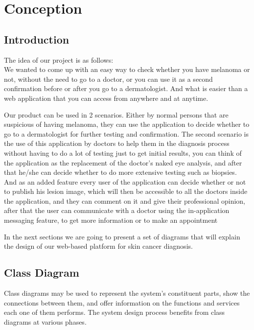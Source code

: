 \section{Conception}
\subsection{Introduction}
The idea of our project is as follows: \\ 
We wanted to come up with an easy way to check whether you have melanoma or not, without the need to go to a doctor, or you can use it as a second confirmation before or after you go to a dermatologist. And what is easier than a web application that you can access from anywhere and at anytime.

Our product can be used in 2 scenarios. Either by normal persons that are suspicious of having melanoma, they can use the application to decide whether to go to a dermatologist for further testing and confirmation. The second scenario is the use of this application by doctors to help them in the diagnosis process without having to do a lot of testing just to get initial results, you can think of the application as the replacement of the doctor's naked eye analysis, and after that he/she can decide whether to do more extensive testing such as biopsies. And as an added feature every user of the application can decide whether or not to publish his lesion image, which will then be accessible to all the doctors inside the application, and they can comment on it and give their professional opinion, after that the user can communicate with a doctor using the in-application messaging feature, to get more information or to make an appointment

In the next sections we are going to present a set of diagrams that will explain the design of our web-based platform for skin cancer diagnosis.

\subsection{Class Diagram}
Class diagrams may be used to represent the system's constituent parts, show the connections between them, and offer information on the functions and services each one of them performs. The system design process benefits from class diagrams at various phases.

